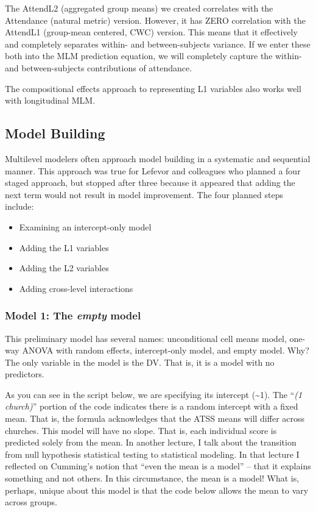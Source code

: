 \documentclass[
  english,
]{book}
\providecommand{\tightlist}{%
  \setlength{\itemsep}{0pt}\setlength{\parskip}{0pt}}
\begin{document}
The AttendL2 (aggregated group means) we created correlates with the Attendance (natural metric) version. However, it has ZERO correlation with the AttendL1 (group-mean centered, CWC) version. This means that it effectively and completely separates within- and between-subjects variance. If we enter these both into the MLM prediction equation, we will completely capture the within- and between-subjects contributions of attendance.

The compositional effects approach to representing L1 variables also works well with longitudinal MLM.

\hypertarget{model-building}{%
\subsection{Model Building}\label{model-building}}

Multilevel modelers often approach model building in a systematic and sequential manner. This approach was true for Lefevor and colleagues \citeyearpar{lefevor_homonegativity_2020} who planned a four staged approach, but stopped after three because it appeared that adding the next term would not result in model improvement. The four planned steps include:

\begin{itemize}
\tightlist
\item
  Examining an intercept-only model
\item
  Adding the L1 variables
\item
  Adding the L2 variables
\item
  Adding cross-level interactions
\end{itemize}

\hypertarget{model-1-the-empty-model}{%
\subsubsection{\texorpdfstring{Model 1: The \emph{empty} model}{Model 1: The empty model}}\label{model-1-the-empty-model}}

This preliminary model has several names: unconditional cell means model, one-way ANOVA with random effects, intercept-only model, and empty model. Why? The only variable in the model is the DV. That is, it is a model with no predictors.

As you can see in the script below, we are specifying its intercept (\textasciitilde1). The ``\emph{(1 \textbar{} church)}'' portion of the code indicates there is a random intercept with a fixed mean. That is, the formula acknowledges that the ATSS means will differ across churches. This model will have no slope. That is, each individual score is predicted solely from the mean. In another lecture, I talk about the transition from null hypothesis statistical testing to statistical modeling. In that lecture I reflected on Cumming's \citeyearpar{cumming_new_2014} notion that ``even the mean is a model'' -- that it explains something and not others. In this circumstance, the mean is a model! What is, perhaps, unique about this model is that the code below allows the mean to vary across groups.
\end{document}
